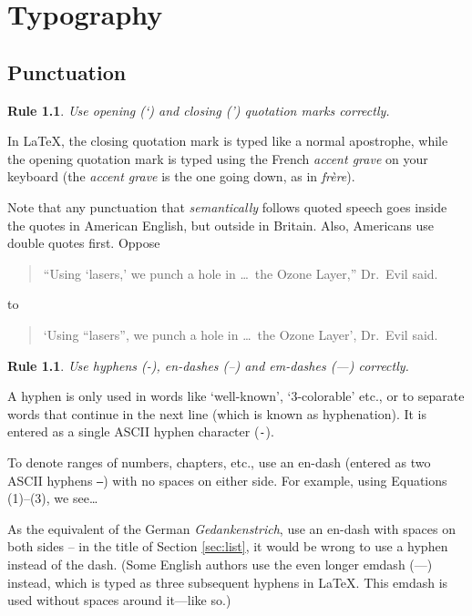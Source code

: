 \chapter{Typography}

\theoremstyle{plain}
\theoremsymbol{}
\newtheorem{Rule}[theorem]{Rule}

\section{Punctuation}

\begin{Rule}
  Use opening (`) and closing (') quotation marks correctly.
\end{Rule}

In \LaTeX, the closing quotation mark is typed like a normal
apostrophe, while the opening quotation mark is typed using the French
\emph{accent grave} on your keyboard (the \emph{accent grave} is the
one going down, as in \emph{frère}).

Note that any punctuation that \emph{semantically} follows quoted
speech goes inside the quotes in American English, but outside in
Britain.  Also, Americans use double quotes first.  Oppose
\begin{quote}
  ``Using `lasers,' we punch a hole in \ldots\ the Ozone Layer,''
  Dr.\ Evil said.
\end{quote}
to
\begin{quote}
  `Using ``lasers'', we punch a hole in \ldots\ the Ozone Layer',
  Dr.\ Evil said.
\end{quote}

\begin{Rule}
  Use hyphens (-), en-dashes (--) and em-dashes (---) correctly.
\end{Rule}

A hyphen is only used in words like `well-known', `$3$-colorable'
etc., or to separate words that continue in the next line (which is
known as hyphenation).  It is entered as a single ASCII hyphen
character (\texttt{-}).

To denote ranges of numbers, chapters, etc., use an en-dash (entered
as two ASCII hyphens \texttt{--}) with no spaces on either side.  For
example, using Equations (1)--(3), we see\ldots

As the equivalent of the German \emph{Gedankenstrich}, use an en-dash
with spaces on both sides -- in the title of Section \ref{sec:list},
it would be wrong to use a hyphen instead of the dash. (Some English
authors use the even longer emdash (---) instead, which is typed as
three subsequent hyphens in \LaTeX. This emdash is used without spaces
around it---like so.)

